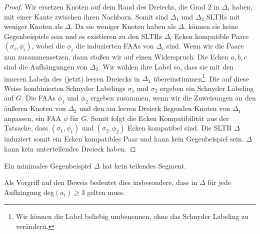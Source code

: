 \begin{proof}
Wir ersetzen Knoten auf dem Rand des Dreiecks, die Grad 2 in $\Delta_i$ haben, mit einer Kante zwischen ihren Nachbarn. Somit sind $\Delta_1$ und $\Delta_2$ SLTRs mit weniger Knoten als $\Delta$. Da sie weniger Knoten haben als $\Delta$, können sie keine Gegenbeispiele sein und es existieren zu den SLTRs $\Delta_i$ Ecken kompatible Paare $(\sigma_i,\phi_i)$, wobei die $\phi_i$ die induzierten FAAs von $\Delta_i$ sind. Wenn wir die Paare nun zusammensetzen, dann stoßen wir auf einen Widerspruch. Die Ecken $a,b,c$ sind die Aufhängungen von $\Delta_2$. Wir wählen ihre Label so, dass sie mit den inneren Labeln des (jetzt) leeren Dreiecks in $\Delta_1$ übereinstimmen\footnote{Wir können die Label beliebig umbenennen, ohne das Schnyder Labeling zu verändern.}. Die auf diese Weise kombinierten Schnyder Labelings $\sigma_1$ und $\sigma_2$ ergeben ein Schnyder Labeling auf $G$. Die FAAs $\phi_1$ und $\phi_2$ ergeben zusammen, wenn wir die Zuweisungen an den äußeren Knoten von $\Delta_2$ und den am leeren Dreieck liegenden Knoten von $\Delta_1$ anpassen, ein FAA $\phi$ für $G$. Somit folgt die Ecken Kompatibilität aus der Tatsache, dass $(\sigma_1,\phi_1)$ und $(\sigma_2,\phi_2)$ Ecken kompatibel sind. Die SLTR $\Delta$ induziert somit ein Ecken kompatibles Paar und kann kein Gegenbeispiel sein. $\Delta$ kann kein unterteilendes Dreieck haben.
\end{proof} 

\begin{lemma}\label{lem3}
Ein minimales Gegenbeispiel $\Delta$ hat kein teilendes Segment.
\end{lemma}

\begin{remark}
Als Vorgriff auf den Beweis bedeutet dies insbesondere, dass in $\Delta$ für jede Aufhängung deg$(a_i) \geq 3$ gelten muss.
\end{remark}

